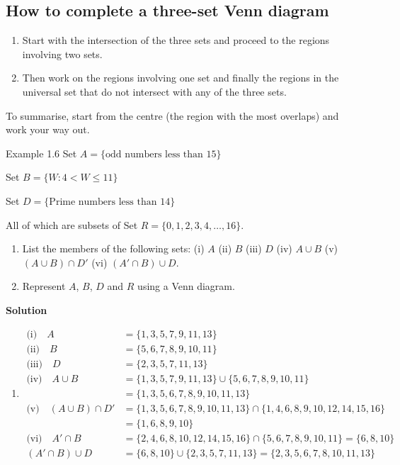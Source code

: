\subsection*{How to complete a three-set Venn diagram}
\begin{enumerate}
  \item Start with the intersection of the three sets and proceed to the regions
  involving two sets.
  \item Then work on the regions involving one set and finally the regions in the
  universal set that do not intersect with any of the three sets.
\end{enumerate}
To summarise, start from the centre (the region with the most overlaps) and work
your way out.

\begin{example}{Example 1.6}
Set $A = \{\text{odd numbers less than } 15\}$

Set $B = \{W : 4 < W \le 11\}$

Set $D = \{\text{Prime numbers less than } 14\}$

All of which are subsets of Set $R = \{0, 1, 2, 3, 4, \ldots, 16\}$.
\begin{enumerate}
  \item[a.] List the members of the following sets: (i) $A$ \quad (ii) $B$ \quad (iii) $D$ \quad (iv) $A \cup B$ \quad (v) $(A \cup B) \cap D'$ \quad (vi) $(A' \cap B) \cup D$.
  \item[b.] Represent $A$, $B$, $D$ and $R$ using a Venn diagram.
\end{enumerate}

\medskip\noindent\textbf{Solution}
\begin{enumerate}
  \item[a.]
  \begin{align*}
    \text{(i)}\quad A &= \{1, 3, 5, 7, 9, 11, 13\} \\
    \text{(ii)}\quad B &= \{5, 6, 7, 8, 9, 10, 11\} \\
    \text{(iii)}\quad D &= \{2, 3, 5, 7, 11, 13\} \\
    \text{(iv)}\quad A \cup B &= \{1, 3, 5, 7, 9, 11, 13\} \cup \{5, 6, 7, 8, 9, 10, 11\} \\
    &= \{1, 3, 5, 6, 7, 8, 9, 10, 11, 13\} \\
    \text{(v)}\quad (A \cup B) \cap D' &= \{1, 3, 5, 6, 7, 8, 9, 10, 11, 13\} \cap \{1, 4, 6, 8, 9, 10, 12, 14, 15, 16\} \\
    &= \{1, 6, 8, 9, 10\} \\
    \text{(vi)}\quad A' \cap B &= \{2, 4, 6, 8, 10, 12, 14, 15, 16\} \cap \{5, 6, 7, 8, 9, 10, 11\} = \{6, 8, 10\} \\
    (A' \cap B) \cup D &= \{6, 8, 10\} \cup \{2, 3, 5, 7, 11, 13\} = \{2, 3, 5, 6, 7, 8, 10, 11, 13\}
  \end{align*}


\end{enumerate}
\end{example}

